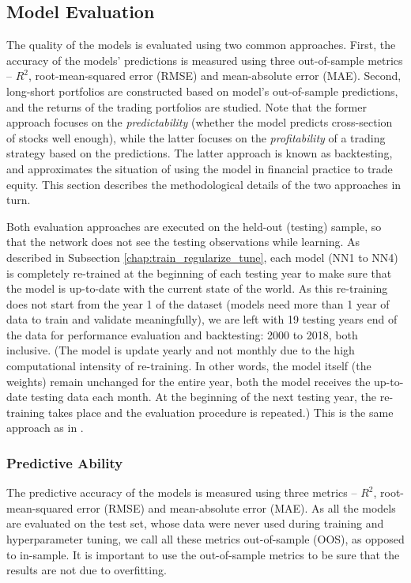 	\subsection{Model Evaluation}
		\label{chap:model_evaluation}
		The quality of the models is evaluated using two common approaches. First, the accuracy of the models' predictions is measured using three out-of-sample metrics – $R^2$, root-mean-squared error (RMSE) and mean-absolute error (MAE). Second, long-short portfolios are constructed based on model's out-of-sample predictions, and the returns of the trading portfolios are studied. Note that the former approach focuses on the \textit{predictability} (whether the model predicts cross-section of stocks well enough), while the latter focuses on the \textit{profitability} of a trading strategy based on the predictions. The latter approach is known as backtesting, and approximates the situation of using the model in financial practice to trade equity. This section describes the methodological details of the two approaches in turn. 
		
		Both evaluation approaches are executed on the held-out (testing) sample, so that the network does not see the testing observations while learning. As described in Subsection \ref{chap:train_regularize_tune}, each model (NN1 to NN4) is completely re-trained at the beginning of each testing year to make sure that the model is up-to-date with the current state of the world. As this re-training does not start from the year 1 of the dataset (models need more than 1 year of data to train and validate meaningfully), we are left with 19 testing years end of the data for performance evaluation and backtesting: 2000 to 2018, both inclusive. (The model is update yearly and not monthly due to the high computational intensity of re-training. In other words, the model itself (the weights) remain unchanged for the entire year, both the model receives the up-to-date testing data each month. At the beginning of the next testing year, the re-training takes place and the evaluation procedure is repeated.) This is the same approach as in \cite{gu2020empirical, tobek2020does}.
		
		\subsubsection{Predictive Ability} 
		
			The predictive accuracy of the models is measured using three metrics – $R^2$, root-mean-squared error (RMSE) and mean-absolute error (MAE). As all the models are evaluated on the test set, whose data were never used during training and hyperparameter tuning, we call all these metrics out-of-sample (OOS), as opposed to in-sample. It is important to use the out-of-sample metrics to be sure that the results are not due to overfitting. 
			
